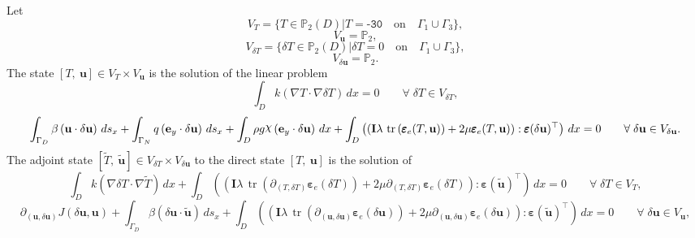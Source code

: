 \documentclass[preview]{standalone}
\let\oldcdot\cdot
\let\cdot\oldcdot
\begin{document}
Let
\begin{equation*}
V_{T} = \{ T \in \mathbb P_{2}(D)| T = \mathtt{\text{-30}}  \quad \text{{on}} \quad\Gamma_{1}\cup\Gamma_{3} \},\end{equation*}
\begin{equation*}
V_{{\mathbf{ u }}} = \mathbb P_{2},\end{equation*}
\begin{equation*}
V_{\delta T} = \{ \delta T \in \mathbb P_{2}(D)| \delta T = 0  \quad \text{{on}} \quad\Gamma_{1}\cup\Gamma_{3} \},\end{equation*}
\begin{equation*}
V_{{\delta\mathbf{  u }}} = \mathbb P_{2}.\end{equation*}
The state $\left[ T, \  {\mathbf{ u }}\right] \in  V_{T}\times V_{{\mathbf{ u }}}$ is the solution of the linear problem
\begin{dmath*}
 \int_{D} k \left(  \nabla T  \cdot  \nabla \delta T  \right) \,dx = 0\qquad \forall\; {\delta T\in V_{\delta T}} , 
\end{dmath*}
\begin{dmath*}
 \int_{\Gamma_D} \beta \left( {\mathbf{ u }} \cdot {\delta\mathbf{  u }} \right) \,ds_x +  \int_{\Gamma_N} q \left( \mathbf e_y \cdot {\delta\mathbf{  u }} \right) \,ds_x +  \int_{D} \rho g \raisebox{\depth}{$\chi$} \left( \mathbf e_y \cdot {\delta\mathbf{  u }} \right) \,dx +  \int_{D} \left( \left( \mathbf{I} \lambda  \,\operatorname{tr}\left(\pmb\varepsilon_{e}(T,{\mathbf{ u }})\right)  + 2 \mu \pmb\varepsilon_{e}(T,{\mathbf{ u }}) \right) \mathrel{:}  \pmb\varepsilon({\delta\mathbf{  u }})^\top  \right) \,dx = 0\qquad \forall\; {{\delta\mathbf{  u }}\in V_{{\delta\mathbf{  u }}}} . 
\end{dmath*}
The adjoint state $\left[ \tilde T, \  \tilde{\mathbf{ u }}\right] \in  V_{\delta T}\times V_{{\delta\mathbf{  u }}}$ to the direct state $\left[ T, \  {\mathbf{ u }}\right]$ is the solution of
\begin{dmath*}
 \int_{D} k \left(  \nabla \delta T  \cdot  \nabla \tilde T  \right) \,dx +  \int_{D} \left( \left( \mathbf{I} \lambda  \,\operatorname{tr}\left(\partial_{(T,\delta T)} \pmb\varepsilon_e(\delta T)\right)  + 2 \mu \partial_{(T,\delta T)} \pmb\varepsilon_e(\delta T) \right) \mathrel{:}  \pmb\varepsilon(\tilde{\mathbf{ u }})^\top  \right) \,dx = 0\qquad \forall\; {\delta T\in V_{T}} , 
\end{dmath*}
\begin{dmath*}
\partial_{({\mathbf{ u }},{\delta\mathbf{  u }})} J({\delta\mathbf{  u }},{\mathbf{ u }}) +  \int_{\Gamma_D} \beta \left( {\delta\mathbf{  u }} \cdot \tilde{\mathbf{ u }} \right) \,ds_x +  \int_{D} \left( \left( \mathbf{I} \lambda  \,\operatorname{tr}\left(\partial_{({\mathbf{ u }},{\delta\mathbf{  u }})} \pmb\varepsilon_e({\delta\mathbf{  u }})\right)  + 2 \mu \partial_{({\mathbf{ u }},{\delta\mathbf{  u }})} \pmb\varepsilon_e({\delta\mathbf{  u }}) \right) \mathrel{:}  \pmb\varepsilon(\tilde{\mathbf{ u }})^\top  \right) \,dx = 0\qquad \forall\; {{\delta\mathbf{  u }}\in V_{{\mathbf{ u }}}} , 
\end{dmath*}
\end{document}

